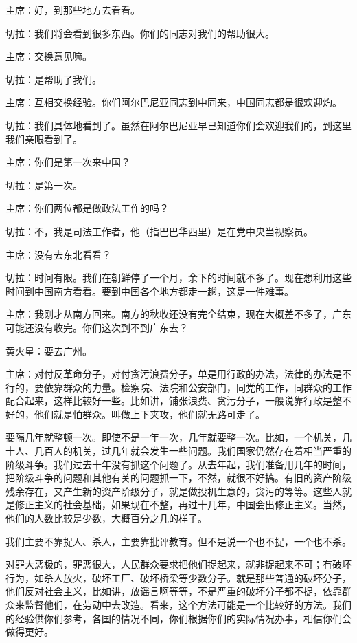 主席：好，到那些地方去看看。

切拉：我们将会看到很多东西。你们的同志对我们的帮助很大。

主席：交换意见嘛。

切拉：是帮助了我们。

主席：互相交换经验。你们阿尔巴尼亚同志到中同来，中国同志都是很欢迎灼。

切拉：我们具体地看到了。虽然在阿尔巴尼亚早已知道你们会欢迎我们的，到这里我们亲眼看到了。

主席：你们是第一次来中国？

切拉：是第一次。

主席：你们两位都是做政法工作的吗？

切拉：不，我是司法工作者，他（指巴巴华西里）是在党中央当视察员。

主席：没有去东北看看？

切拉：时问有限。我们在朝鲜停了一个月，余下的时间就不多了。现在想利用这些时间到中国南方看看。要到中国各个地方都走一趟，这是一件难事。

主席：我刚才从南方回来。南方的秋收还没有完全结束，现在大概差不多了，广东可能还没有收完。你们这次到不到广东去？

黄火星：要去广州。

主席：对付反革命分子，对付贪污浪费分子，单是用行政的办法，法律的办法是不行的，要依靠群众的力量。检察院、法院和公安部门，同党的工作，同群众的工作配合起来，这样比较好一些。比如讲，铺张浪费、贪污分子，一般说靠行政是整不好的，他们就是怕群众。叫做上下夹攻，他们就无路可走了。

要隔几年就整顿一次。即使不是一年一次，几年就要整一次。比如，一个机关，几十人、几百人的机关，过几年就会发生一些问题。我们国家仍然存在着相当严重的阶级斗争。我们过去十年没有抓这个问题了。从去年起，我们准备用几年的时间，把阶级斗争的问题和其他有关的问题抓一下，不然，就很不好搞。有旧的资产阶级残余存在，又产生新的资产阶级分子，就是做投机生意的，贪污的等等。这些人就是修正主义的社会基础，如果现在不整，再过十几年，中国会出修正主义。当然，他们的人数比较是少数，大概百分之几的样子。

我们主要不靠捉人、杀人，主要靠批评教育。但不是说一个也不捉，一个也不杀。

对罪大恶极的，罪恶很大，人民群众要求把他们捉起来，就非捉起来不可；有破坏行为，如杀人放火，破坏工厂、破坏桥梁等少数分子。就是那些普通的破坏分子，他们反对社会主义，比如讲，放谣言啊等等，不是严重的破坏分子都不捉，依靠群众来监督他们，在劳动中去改造。看来，这个方法可能是一个比较好的方法。我们的经验供你们参考，各国的情况不同，你们根据你们的实际情况办事，相信你们会做得更好。

